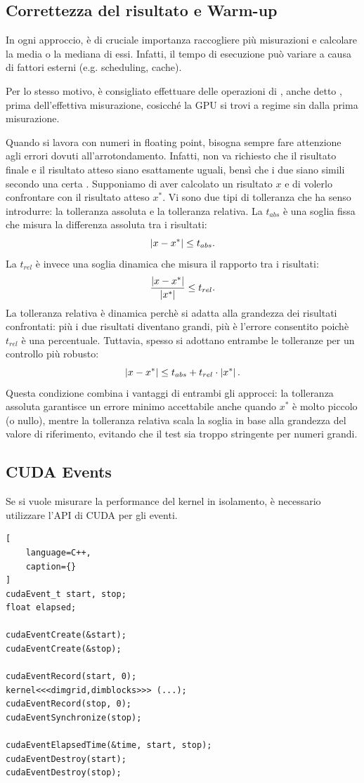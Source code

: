 \subsection{Correttezza del risultato e Warm-up}
In ogni approccio, è di cruciale importanza raccogliere più misurazioni e calcolare la media o la mediana di essi. Infatti, il tempo di esecuzione può variare a causa di fattori esterni (e.g. scheduling, cache).

Per lo stesso motivo, è consigliato effettuare delle operazioni di , anche detto , prima dell'effettiva misurazione, cosicché la GPU si trovi a regime sin dalla prima misurazione.

Quando si lavora con numeri in floating point, bisogna sempre fare attenzione agli errori dovuti all'arrotondamento.
Infatti, non va richiesto che il risultato finale e il risultato atteso siano esattamente uguali, bensì che i due siano simili secondo una certa .
Supponiamo di aver calcolato un risultato \(x\) e di volerlo confrontare con il risultato atteso \(x^*\).
Vi sono due tipi di tolleranza che ha senso introdurre: la tolleranza assoluta e la tolleranza relativa.
La  \(t_{abs}\) è una soglia fissa che misura la differenza assoluta tra i risultati:
\[ \left|x - x^*\right| \leq t_{abs}. \]
La  \(t_{rel}\) è invece una soglia dinamica che misura il rapporto tra i risultati:
\[ \frac{\left|x - x^*\right|}{\left|x^*\right|} \leq t_{rel}. \]
La tolleranza relativa è dinamica perchè si adatta alla grandezza dei risultati confrontati: più i due risultati diventano grandi, più è l'errore consentito poichè \(t_{rel}\) è una percentuale.
Tuttavia, spesso si adottano entrambe le tolleranze per un controllo più robusto:
\[
    \left|x - x^*\right| \leq t_{abs} + t_{rel} \cdot \left|x^*\right|.
\]
Questa condizione combina i vantaggi di entrambi gli approcci: la tolleranza assoluta garantisce un errore minimo accettabile anche quando \(x^*\) è molto piccolo (o nullo), mentre la tolleranza relativa scala la soglia in base alla grandezza del valore di riferimento, evitando che il test sia troppo stringente per numeri grandi.

\subsection{CUDA Events}
Se si vuole misurare la performance del kernel in isolamento, è necessario utilizzare l'API di CUDA per gli eventi.

\begin{lstlisting}[
    language=C++,
    caption={}
]
cudaEvent_t start, stop;
float elapsed;

cudaEventCreate(&start);
cudaEventCreate(&stop);

cudaEventRecord(start, 0);
kernel<<<dimgrid,dimblocks>>> (...);
cudaEventRecord(stop, 0);
cudaEventSynchronize(stop);

cudaEventElapsedTime(&time, start, stop);
cudaEventDestroy(start);
cudaEventDestroy(stop);
\end{lstlisting}

